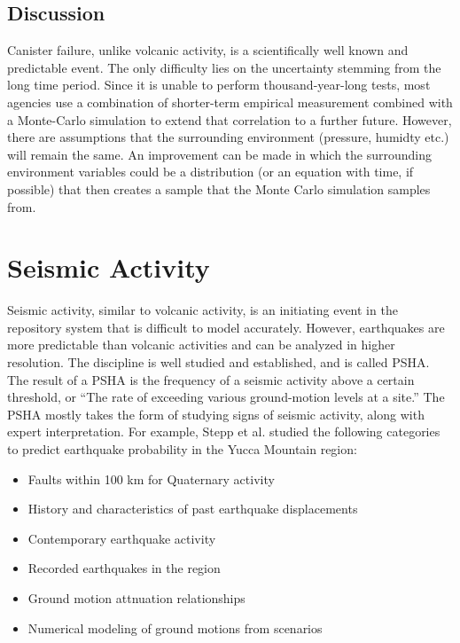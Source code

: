 \documentclass[12pt]{article}
\begin{document}
\subsection{Discussion}
Canister failure, unlike volcanic activity, is a scientifically well
known and predictable event. The only difficulty lies on the 
uncertainty stemming from the long time period. Since it is unable
to perform thousand-year-long tests, most agencies use a combination
of shorter-term empirical measurement combined with a Monte-Carlo 
simulation to extend that correlation to a further future. However,
there are assumptions that the surrounding environment (pressure, humidty etc.)
will remain the same. An improvement can be made in which the surrounding environment
variables could be a distribution (or an equation with time, if possible)
that then creates a sample that the Monte Carlo simulation samples from.

\FloatBarrier


\section{Seismic Activity}

Seismic activity, similar to volcanic activity, is an initiating event
in the repository system that is difficult to model accurately. However,
earthquakes are more predictable than volcanic activities and can be 
analyzed in higher resolution. The discipline is well studied and 
established, and is called \gls{PSHA}.
The result of a \gls{PSHA} is the frequency of a seismic activity above
a certain threshold, or ``The rate of exceeding various ground-motion
levels at a site.'' \cite{thenhaus_seismic_2003}
 The \gls{PSHA} mostly takes the form of studying signs of seismic activity,
along with expert interpretation.
For example, Stepp et al. \cite{stepp_probabilistic_2001} studied the following categories
to predict earthquake probability in the Yucca Mountain region:
\begin{itemize}
    \item Faults within 100 km for Quaternary activity
    \item History and characteristics of past earthquake displacements  
    \item Contemporary earthquake activity
    \item Recorded earthquakes in the region
    \item Ground motion attnuation relationships
    \item Numerical modeling of ground motions from scenarios
\end{itemize}
\end{document}
